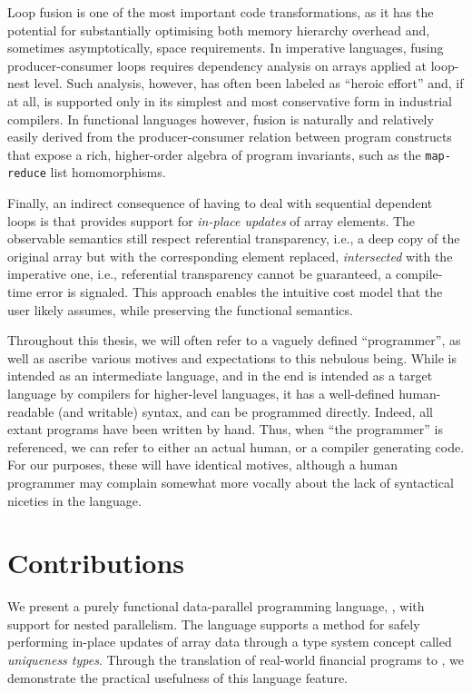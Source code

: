 Loop fusion is one of the most important code transformations, as it
has the potential for substantially optimising both memory hierarchy
overhead and, sometimes asymptotically, space requirements.  In
imperative languages, fusing producer-consumer loops requires
dependency analysis on arrays applied at loop-nest level.  Such
analysis, however, has often been labeled as ``heroic effort'' and, if
at all, is supported only in its simplest and most conservative form
in industrial compilers.  In functional languages however, fusion is
naturally and relatively easily derived from the producer-consumer
relation between program constructs that expose a rich, higher-order
algebra of program invariants, such as the \texttt{map-reduce} list
homomorphisms.

Finally, an indirect consequence of having to deal with sequential
dependent loops is that \LO{} provides support for \textit{in-place
  updates} of array elements.  The observable semantics still respect
referential transparency, i.e., a deep copy of the original array but
with the corresponding element replaced, \textit{intersected} with the
imperative one, i.e., referential transparency cannot be guaranteed, a
compile-time error is signaled.  This approach enables the intuitive
cost model that the user likely assumes, while preserving the
functional semantics.

Throughout this thesis, we will often refer to a vaguely defined
``programmer'', as well as ascribe various motives and expectations to
this nebulous being.  While \LO{} is intended as an intermediate
language, and in the end is intended as a target language by compilers
for higher-level languages, it has a well-defined human-readable (and
writable) syntax, and can be programmed directly.  Indeed, all extant
\LO{} programs have been written by hand.  Thus, when ``the
programmer'' is referenced, we can refer to either an actual human, or
a compiler generating \LO{} code.  For our purposes, these will have
identical motives, although a human programmer may complain somewhat
more vocally about the lack of syntactical niceties in the language.

\section{Contributions}

We present a purely functional data-parallel programming language,
\LO{}, with support for nested parallelism.  The language supports a
method for safely performing in-place updates of array data through a
type system concept called \textit{uniqueness types}.  Through the
translation of real-world financial programs to \LO{}, we demonstrate
the practical usefulness of this language feature.

